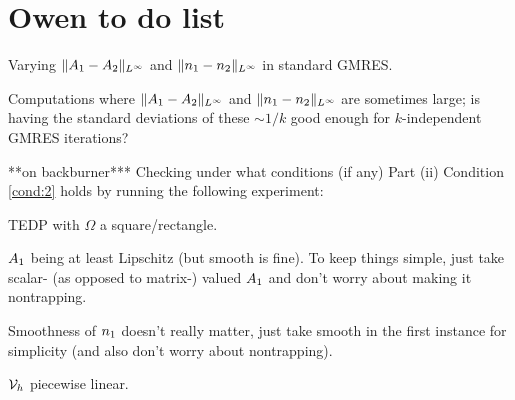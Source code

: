 
%
%
%

\section*{Owen to do list}
\ben
\item Varying  $\|A_{1}-A_{2}\|_{L^\infty}$ and $\|n_{1}-n_{2}\|_{L^\infty}$ in standard GMRES.
\item Computations where $\|A_{1}-A_{2}\|_{L^\infty}$ and $\|n_{1}-n_{2}\|_{L^\infty}$ are sometimes large; is having the standard deviations of these $\sim 1/k$ good enough for $k$-independent GMRES iterations?
\item ***on backburner*** Checking under what conditions (if any) Part (ii) Condition \ref{cond:2} holds by running the following experiment:
\bit
\item TEDP with $\Omega$ a square/rectangle.
\item $A_{1}$ being at least Lipschitz (but smooth is fine). To keep things simple, just take scalar- (as opposed to matrix-) valued $A_{1}$ and don't worry about making it nontrapping.
\item Smoothness of $n_{1}$ doesn't really matter, just take smooth in the first instance for simplicity (and also don't worry about nontrapping).
\item $\mathcal V_h$ piecewise linear.
